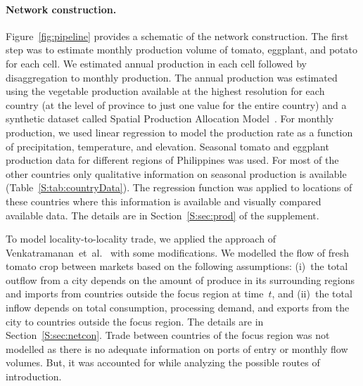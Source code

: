 \documentclass[11pt]{article}
\theoremstyle{definition}
\begin{document}
\paragraph{Network construction.} 
Figure~\ref{fig:pipeline} provides a schematic of the network construction.
The first step was to estimate monthly production volume of tomato,
eggplant, and potato for each cell. We estimated annual production in each
cell followed by disaggregation to monthly production. The annual
production was estimated using the vegetable production available at the
highest resolution for each country (at the level of province to just one
value for the entire country) and a synthetic dataset called Spatial
Production Allocation Model~\cite{spam}. For monthly production, we
used linear regression to model the production rate as a function of
precipitation, temperature, and elevation. Seasonal tomato and eggplant
production data for different regions of Philippines was used. For most of
the other countries only qualitative information on seasonal production
is available (Table~\ref{S:tab:countryData}). The regression function was
applied to locations of these countries where this information is
available and visually compared available data. The details are in
Section~\ref{S:sec:prod} of the supplement.

To model locality-to-locality trade, we applied the approach of
Venkatramanan~et~al.~\cite{venkatramanan2019modeling}
with some modifications. We modelled the flow of fresh tomato crop between
markets based on the following assumptions: (i)~the total outflow from a
city depends on the amount of produce in its surrounding regions and
imports from countries outside the focus region at time~$t$, and (ii)~the
total inflow depends on total consumption, processing demand, and exports
from the city to countries outside the focus region. The details are in
Section~\ref{S:sec:netcon}.  Trade between countries of the focus region
was not modelled as there is no adequate information on ports of entry or
monthly flow volumes. But, it was accounted for while analyzing the
possible routes of introduction.
\end{document}

